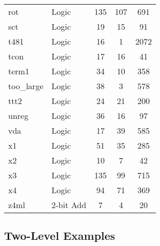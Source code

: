 {\begin{pespace}
\begin{center}
\begin{tabular}{|l|l|c|c|c|}
rot     & Logic            & 135    & 107     &   691 \\
sct     & Logic            &  19    & 15      &    91 \\
t481    & Logic            &  16    & 1       &  2072 \\
tcon    & Logic            &  17    & 16      &    41 \\
term1   & Logic            &  34    & 10      &   358 \\
too\_large& Logic          &  38    & 3       &   578 \\
ttt2    & Logic            &  24    & 21      &   200 \\
unreg   & Logic            &  36    & 16      &    97 \\
vda     & Logic            &  17    & 39      &   585 \\
x1      & Logic            &  51    & 35      &   285 \\
x2      & Logic            &  10    & 7       &    42 \\
x3      & Logic            & 135    & 99      &   715 \\
x4      & Logic            &  94    & 71      &   369 \\
z4ml    & 2-bit Add        &   7    & 4       &    20 \\
\hline
\end{tabular}
\end{center}

\newpage
\subsection{ Two-Level Examples}



\vspace*{1.0cm}



\begin{center}


\begin{tabular}{|l|c|c|c|c|}
\hline



\end{tabular}
\end{center}
\end{pespace}}
